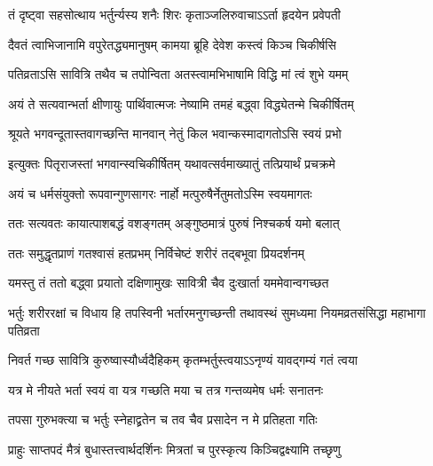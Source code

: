 \twolineshloka
{तं दृष्ट्वा सहसोत्थाय भर्तुर्न्यस्य शनैः शिरः}
{कृताञ्जलिरुवाचाऽऽर्ता हृदयेन प्रवेपती}


\twolineshloka
{दैवतं त्वाभिजानामि वपुरेतद्ध्यमानुषम्}
{कामया ब्रूहि देवेश कस्त्वं किञ्च चिकीर्षसि}




\twolineshloka
{पतिव्रताऽसि सावित्रि तथैव च तपोन्विता}
{अतस्त्वामभिभाषामि विद्धि मां त्वं शुभे यमम्}


\twolineshloka
{अयं ते सत्यवान्भर्ता क्षीणायुः पार्थिवात्मजः}
{नेष्यामि तमहं बद्ध्वा विद्ध्येतन्मे चिकीर्षितम्}




\twolineshloka
{श्रूयते भगवन्दूतास्तवागच्छन्ति मानवान्}
{नेतुं किल भवान्कस्मादागतोऽसि स्वयं प्रभो}




\twolineshloka
{इत्युक्तः पितृराजस्तां भगवान्स्वचिकीर्षितम्}
{यथावत्सर्वमाख्यातुं तत्प्रियार्थं प्रचक्रमे}


\twolineshloka
{अयं च धर्मसंयुक्तो रूपवान्गुणसागरः}
{नार्हो मत्पुरुषैर्नेतुमतोऽस्मि स्वयमागतः}


\twolineshloka
{ततः सत्यवतः कायात्पाशबद्धं वशङ्गतम्}
{अङ्गुष्ठमात्रं पुरुषं निश्चकर्ष यमो बलात्}


\twolineshloka
{ततः समुद्धृतप्राणं गतश्वासं हतप्रभम्}
{निर्विचेष्टं शरीरं तद्बभूवा प्रियदर्शनम्}


\twolineshloka
{यमस्तु तं ततो बद्ध्वा प्रयातो दक्षिणामुखः}
{सावित्री चैव दुःखार्ता यममेवान्वगच्छत}


\threelineshloka
{भर्तुः शरीररक्षां च विधाय हि तपस्विनी}
{भर्तारमनुगच्छन्ती  तथावस्थं सुमध्यमा}
{नियमव्रतसंसिद्धा महाभागा पतिव्रता}




\twolineshloka
{निवर्त गच्छ सावित्रि कुरुष्वास्यौर्ध्वदैहिकम्}
{कृतम्भर्तुस्त्वयाऽऽनृण्यं यावद्गम्यं गतं त्वया}




\twolineshloka
{यत्र मे नीयते भर्ता स्वयं वा यत्र गच्छति}
{मया च तत्र गन्तव्यमेष धर्मः सनातनः}


\twolineshloka
{तपसा गुरुभक्त्या च भर्तुः स्नेहाद्व्रतेन च}
{तव चैव प्रसादेन न मे प्रतिहता गतिः}


\twolineshloka
{प्राहुः साप्तपदं मैत्रं बुधास्तत्त्वार्थदर्शिनः}
{मित्रतां च पुरस्कृत्य किञ्चिद्वक्ष्यामि तच्छृणु}


